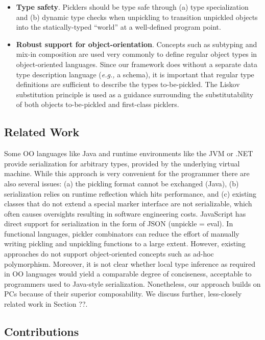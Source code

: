 \documentclass[preprint,10pt]{sigplanconf}
\begin{document}
\begin{itemize}
\item {\bf Type safety}. Picklers should be type safe through (a) type
specialization and (b) dynamic type checks when unpickling to transition
unpickled objects into the statically-typed ``world'' at a well-defined program
point.

\item {\bf Robust support for object-orientation}. Concepts such as subtyping and
mix-in composition are used very commonly to define regular object types in
object-oriented languages. Since our framework does without a separate data
type description language ({\em e.g.,} a schema), it is important that regular
type definitions are sufficient to describe the types to-be-pickled. The
Liskov substitution principle is used as a guidance surrounding the
substitutability of both objects to-be-pickled and first-class picklers.
\end{itemize}


\subsection{Related Work}

Some OO languages like Java and runtime environments like the JVM or .NET
provide serialization for arbitrary types, provided by the underlying virtual
machine. While this approach is very convenient for the programmer there are
also several issues: (a) the pickling format cannot be exchanged (Java), (b)
serialization relies on runtime reflection which hits performance, and (c)
existing classes that do not extend a special marker interface are not
serializable, which often causes oversights resulting in software engineering
costs. JavaScript has direct support for serialization in the form of JSON
(unpickle = eval). In functional languages, pickler combinators can reduce the
effort of manually writing pickling and unpickling functions to a large
extent. However, existing approaches do not support object-oriented concepts
such as ad-hoc polymorphism. Moreover, it is not clear whether local type
inference as required in OO languages would yield a comparable degree of
conciseness, acceptable to programmers used to Java-style serialization.
Nonetheless, our approach builds on PCs because of their superior
composability. We discuss further, less-closely related work in Section ??.

\subsection{Contributions}
\end{document}
